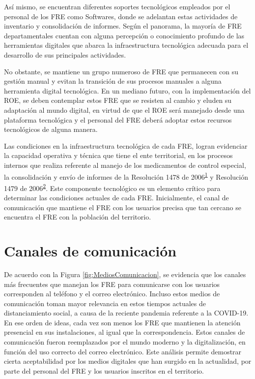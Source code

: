 \documentclass[
]{book}
\begin{document}
Así mismo, se encuentran diferentes soportes tecnológicos empleados por el personal de los FRE como Softwares, donde se adelantan estas actividades de inventario y consolidación de informes. Según el panorama, la mayoría de FRE departamentales cuentan con alguna percepción o conocimiento profundo de las herramientas digitales que abarca la infraestructura tecnológica adecuada para el desarrollo de sus principales actividades.

No obstante, se mantiene un grupo numeroso de FRE que permanecen con su gestión manual y evitan la transición de sus procesos manuales a alguna herramienta digital tecnológica. En un mediano futuro, con la implementación del ROE, se deben contemplar estos FRE que se resisten al cambio y eluden su adaptación al mundo digital, en virtud de que el ROE será manejado desde una plataforma tecnológica y el personal del FRE deberá adoptar estos recursos tecnológicos de alguna manera.

Las condiciones en la infraestructura tecnológica de cada FRE, logran evidenciar la capacidad operativa y técnica que tiene el ente territorial, en los procesos internos que realiza referente al manejo de los medicamentos de control especial, la consolidación y envío de informes de la Resolución 1478 de 2006\textsuperscript{\protect\hyperlink{ref-MSPS1478-2006}{1}} y Resolución 1479 de 2006\textsuperscript{\protect\hyperlink{ref-MSPS1479-2006}{2}}. Este componente tecnológico es un elemento crítico para determinar las condiciones actuales de cada FRE. Inicialmente, el canal de comunicación que mantiene el FRE con los usuarios precisa que tan cercano se encuentra el FRE con la población del territorio.

\hypertarget{canales-de-comunicaciuxf3n}{%
\section{Canales de comunicación}\label{canales-de-comunicaciuxf3n}}

De acuerdo con la Figura \ref{fig:MediosComunicacion}, se evidencia que los canales más frecuentes que manejan los FRE para comunicarse con los usuarios corresponden al teléfono y el correo electrónico. Incluso estos medios de comunicación toman mayor relevancia en estos tiempos actuales de distanciamiento social, a causa de la reciente pandemia referente a la COVID-19. En ese orden de ideas, cada vez son menos los FRE que mantienen la atención presencial en sus instalaciones, al igual que la correspondencia. Estos canales de comunicación fueron reemplazados por el mundo moderno y la digitalización, en función del uso correcto del correo electrónico. Este análisis permite demostrar cierta aceptabilidad por los medios digitales que han surgido en la actualidad, por parte del personal del FRE y los usuarios inscritos en el territorio.
\end{document}
